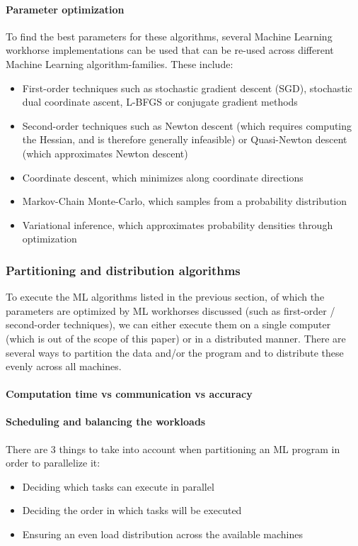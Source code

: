 \paragraph{Parameter optimization}
To find the best parameters for these algorithms, several Machine Learning workhorse implementations can be used that can be re-used across different Machine Learning algorithm-families. These include:
\begin{itemize}
	\item First-order techniques such as stochastic gradient descent (SGD)\cite{bottou2010large}, stochastic dual coordinate ascent\cite{Shal13}, L-BFGS\cite{liu1989limited} or conjugate gradient methods\cite{hestenes1952methods}\cite{dai1999nonlinear}
	\item Second-order techniques such as Newton descent\cite{polyak2007newton} (which requires computing the Hessian, and is therefore generally infeasible) or Quasi-Newton descent\cite{byrd2016stochastic} (which approximates Newton descent)
	\item Coordinate descent\cite{wright2015coordinate}, which minimizes along coordinate directions
	\item Markov-Chain Monte-Carlo\cite{brooks1998markov}, which samples from a probability distribution
	\item Variational inference\cite{Blei17}, which approximates probability densities through optimization
\end{itemize}




\subsubsection{Partitioning and distribution algorithms}
To execute the ML algorithms listed in the previous section, of which the parameters are optimized by ML workhorses discussed (such as first-order / second-order techniques), we can either execute them on a single computer (which is out of the scope of this paper) or in a distributed manner. There are several ways to partition the data and/or the program and to distribute these evenly across all machines.


\paragraph{Computation time vs communication vs accuracy}


\paragraph{Scheduling and balancing the workloads}
There are 3 things to take into account when partitioning an ML program in order to parallelize it:\cite{Xing16}\\
\begin{itemize}
	\item Deciding which tasks can execute in parallel
	\item Deciding the order in which tasks will be executed
	\item Ensuring an even load distribution across the available machines
\end{itemize}


